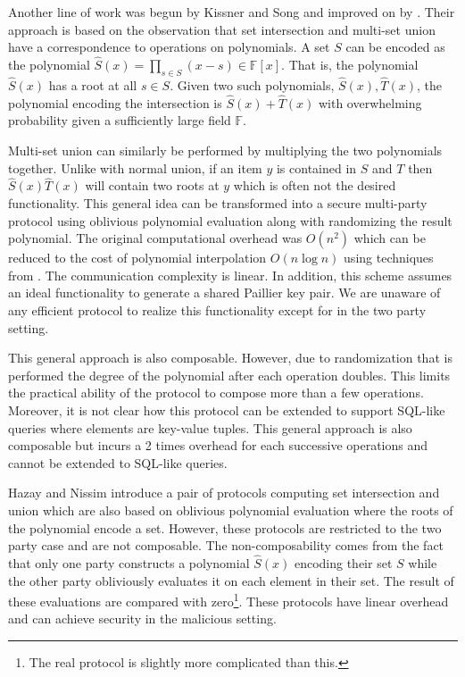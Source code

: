 \documentclass[11pt,letterpaper]{article}
\begin{document}
\iffullversion
Another line of work was begun by Kissner and Song\cite{KS06} and improved on by \cite{MF06}. Their approach is based on the observation that set intersection and multi-set union have a correspondence to operations on polynomials. A set $S$ can be encoded as the polynomial $\hat S(x)= \prod_{s\in S}(x-s)\in \mathbb{F}[x]$. That is, the polynomial $\hat S(x)$ has a root at all $s\in S$. Given two such polynomials, $\hat S(x), \hat T(x)$, the polynomial encoding the intersection is $\hat S(x)+\hat T(x)$ with overwhelming probability given a sufficiently large field $\mathbb{F}$.

Multi-set union can similarly be performed by multiplying the two polynomials together. Unlike with normal union, if an item $y$ is contained in $S$ and $T$ then $\hat S(x)\hat T(x)$ will contain two roots at $y$ which is often not the desired functionality. This general idea can be transformed into a secure multi-party protocol using oblivious polynomial evaluation\cite{NP99} along with randomizing the result polynomial. The original computational overhead was $O(n^2)$ which can be reduced to the cost of polynomial interpolation $O(n\log n)$ using techniques from \cite{MF06}. The communication complexity is linear. In addition, this scheme assumes an ideal functionality to generate a shared Paillier key pair. We are unaware of any efficient protocol to realize this functionality except for \cite{RSA:HMRT12} in the two party setting.

This general approach is also composable. However, due to randomization that is performed the degree of the polynomial after each operation doubles. This limits the practical ability of the protocol to compose more than a few operations. Moreover, it is not clear how this protocol can be extended to support SQL-like queries where elements are key-value tuples. This general approach is also composable but incurs a 2 times overhead for each successive operations and cannot be extended to SQL-like queries. 
\fi


\iffullversion
Hazay and Nissim\cite{HN12} introduce a pair of protocols computing set intersection and union which are also based on oblivious polynomial evaluation where the roots of the polynomial encode a set. However, these protocols are restricted to the two party case and are not composable. The non-composability comes from the fact that only one party constructs a polynomial $\hat S(x)$ encoding their set $S$ while the other party obliviously evaluates it on each element in their set. The result of these evaluations are compared with zero\footnote{The real protocol is slightly more complicated than this.}. These protocols have linear overhead and can achieve security in the malicious setting.
\fi
\end{document}
